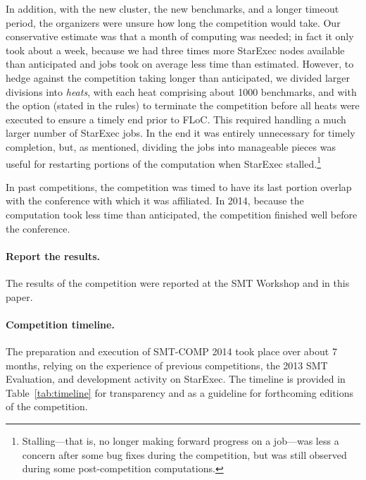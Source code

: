 \documentclass[twoside,11pt]{article}
\begin{document}
In addition, with the new cluster, the new benchmarks, and a longer timeout period, the organizers were unsure how long the competition would take. Our conservative estimate was that a month of computing was needed; in fact it only took about a week, because we had three times more StarExec nodes available than anticipated and jobs took on average less time than estimated. However, to hedge against the competition taking longer than anticipated, we divided larger divisions into \emph{heats}, with each heat comprising about 1000 benchmarks, and with the option (stated in the rules) to terminate the competition before all heats were executed to ensure a timely end prior to FLoC. This required handling a much larger number of StarExec jobs. In the end it was entirely unnecessary for timely completion, but, as mentioned, dividing the jobs into manageable pieces was useful for restarting portions of the computation when StarExec stalled.\footnote{Stalling---that is, no longer making forward progress on a job---was less a concern after some bug fixes during the competition, but was still observed during some post-competition computations.}

In past competitions, the competition was timed to have its last portion overlap with the conference with which it was affiliated. In 2014, because the computation took less time than anticipated, the competition finished well before the conference.

\paragraph{Report the results.} The results of the competition were reported at the SMT Workshop and in this paper.

\paragraph{Competition timeline.}

The preparation and execution of SMT-COMP 2014 took place over about 7 months,
relying on the experience of previous competitions, the 2013 SMT Evaluation, and
development activity on StarExec. The timeline is provided in
Table~\ref{tab:timeline} for transparency and as a guideline for forthcoming
editions of the competition.
\end{document}

